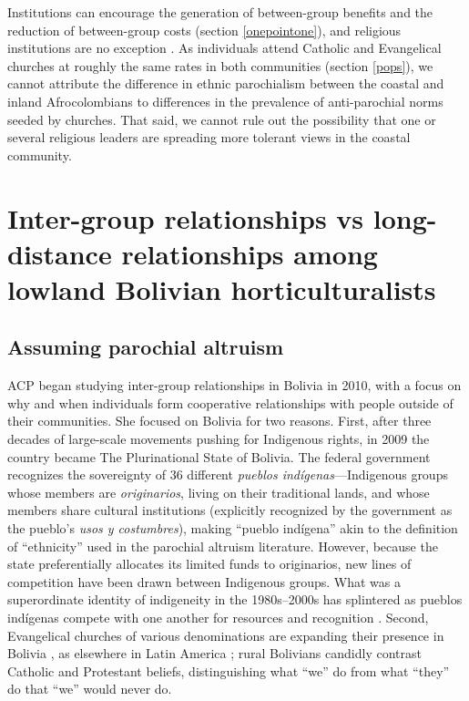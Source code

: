 \documentclass[bibauthoryear]{aa}
\begin{document}
Institutions can encourage the generation of between-group benefits and the reduction of between-group costs (section \ref{onepointone}), and religious institutions are no exception \citep{lang2019moralizing}. As individuals attend Catholic and Evangelical churches at roughly the same rates in both communities (section \ref{pops}), we cannot attribute the difference in ethnic parochialism between the coastal and inland Afrocolombians to differences in the prevalence of anti-parochial norms seeded by churches. That said, we cannot rule out the possibility that one or several religious leaders are spreading more tolerant views in the coastal community.


\section{Inter-group relationships vs long-distance relationships among lowland Bolivian horticulturalists}
\subsection{Assuming parochial altruism}
ACP began studying inter-group relationships in Bolivia in 2010, with a focus on why and when individuals form cooperative relationships with people outside of their communities.   She focused on Bolivia for two reasons. First, after three decades of large-scale movements pushing for Indigenous rights,  in 2009 the country became The Plurinational State of Bolivia. The federal government recognizes the sovereignty of 36 different  \textit{pueblos ind\'igenas}---Indigenous groups whose members are \textit{originarios}, living on their traditional lands, and whose members share cultural institutions (explicitly recognized by the government as the pueblo's \textit{usos y costumbres}), making ``pueblo ind\'igena'' akin to the definition of ``ethnicity'' used in the parochial altruism literature. However, because the state preferentially allocates its limited funds to originarios, new lines of competition have been drawn between Indigenous groups. What was a superordinate identity of indigeneity in the 1980s--2000s has splintered as pueblos ind\'igenas compete with one another for resources and recognition \citep{fontana2014indigenous}.
Second, Evangelical churches of various denominations are expanding their presence in Bolivia \citep{lesley1993religious}, as elsewhere in Latin America \citep{stoll1990latin}; rural Bolivians candidly contrast Catholic and Protestant beliefs, distinguishing what ``we'' do from what ``they'' do that ``we'' would never do. 
\end{document}

